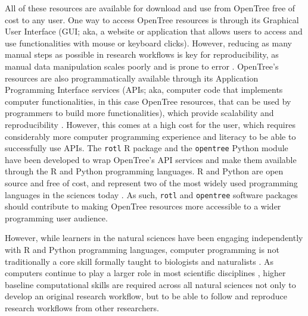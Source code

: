 \documentclass[12pt]{article}
\begin{document}
All of these resources 
are available for download and use from OpenTree free of cost to any user.
One way to access OpenTree resources is through its Graphical User Interface (GUI; aka, a website or application that allows users to access and use functionalities with mouse or keyboard clicks).
However, reducing as many manual steps as possible in research workflows is key for reproducibility, as manual data manipulation scales poorly and is prone to error \citep{bakken2019journey}.
OpenTree's resources are also programmatically available through its Application Programming Interface services (APIs; aka, computer code that implements computer functionalities, in this case OpenTree resources, that can be used by programmers
to build more functionalities), which provide scalability and reproducibility \citep{opentreeAPIv3}.
However, this comes at a high cost for the user, which requires considerably more computer programming experience and literacy to be able to successfully use APIs.
The \texttt{rotl} R package \citep{michonneau2016rotl} and the \texttt{opentree} Python module \citep{mctavish2021opentree} have been developed to wrap OpenTree's API services
and make them available through the R and Python programming languages.
R and Python are open source and free of cost, and represent two of the most widely used programming languages in the sciences today \citep{eglen2009quick, baker2017scientific}.
As such, \texttt{rotl} and \texttt{opentree} software packages should contribute to making OpenTree resources more accessible to a wider programming user audience.

However, while learners in the natural sciences have been engaging independently with R and Python programming languages, computer programming is not traditionally a core skill formally taught to biologists and naturalists \citep{sayres2018bioinformatics, wright2019the, williams2019barriers}.
As computers continue to play a larger role in most scientific disciplines \citep{piccolo2016tools}, higher baseline computational skills are required across all natural sciences not only to develop an original research workflow, but to be able to follow and reproduce research workflows from other researchers.
\end{document}
